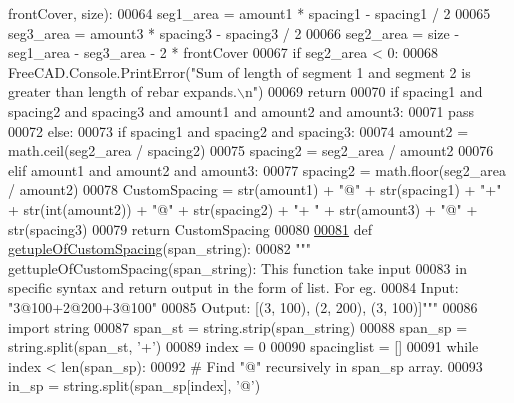 \begin{DoxyCode}
      frontCover, size):
00064     seg1\_area = amount1 * spacing1 - spacing1 / 2
00065     seg3\_area = amount3 * spacing3 - spacing3 / 2
00066     seg2\_area = size - seg1\_area - seg3\_area - 2 * frontCover
00067     \textcolor{keywordflow}{if} seg2\_area < 0:
00068         FreeCAD.Console.PrintError(\textcolor{stringliteral}{"Sum of length of segment 1 and segment 2 is greater than length of
       rebar expands.\(\backslash\)n"})
00069         \textcolor{keywordflow}{return}
00070     \textcolor{keywordflow}{if} spacing1 \textcolor{keywordflow}{and} spacing2 \textcolor{keywordflow}{and} spacing3 \textcolor{keywordflow}{and} amount1 \textcolor{keywordflow}{and} amount2 \textcolor{keywordflow}{and} amount3:
00071         \textcolor{keywordflow}{pass}
00072     \textcolor{keywordflow}{else}:
00073         \textcolor{keywordflow}{if} spacing1 \textcolor{keywordflow}{and} spacing2 \textcolor{keywordflow}{and} spacing3:
00074             amount2 = math.ceil(seg2\_area / spacing2)
00075             spacing2 = seg2\_area / amount2
00076         \textcolor{keywordflow}{elif} amount1 \textcolor{keywordflow}{and} amount2 \textcolor{keywordflow}{and} amount3:
00077             spacing2 = math.floor(seg2\_area / amount2)
00078     CustomSpacing = str(amount1) + \textcolor{stringliteral}{"@"} + str(spacing1) + \textcolor{stringliteral}{"+"} + str(int(amount2)) + \textcolor{stringliteral}{"@"} + str(spacing2) + \textcolor{stringliteral}{"+
      "} + str(amount3) + \textcolor{stringliteral}{"@"} + str(spacing3)
00079     \textcolor{keywordflow}{return} CustomSpacing
00080 
\hypertarget{RebarDistribution_8py_source.tex_l00081}{}\hyperlink{namespaceRebarDistribution_a59ac567a8536ea3b5e7a9900a898e0c0}{00081} \textcolor{keyword}{def }\hyperlink{namespaceRebarDistribution_a59ac567a8536ea3b5e7a9900a898e0c0}{getupleOfCustomSpacing}(span\_string):
00082     \textcolor{stringliteral}{""" gettupleOfCustomSpacing(span\_string): This function take input}
00083 \textcolor{stringliteral}{    in specific syntax and return output in the form of list. For eg.}
00084 \textcolor{stringliteral}{    Input: "3@100+2@200+3@100"}
00085 \textcolor{stringliteral}{    Output: [(3, 100), (2, 200), (3, 100)]"""}
00086     \textcolor{keyword}{import} string
00087     span\_st = string.strip(span\_string)
00088     span\_sp = string.split(span\_st, \textcolor{stringliteral}{'+'})
00089     index = 0
00090     spacinglist = []
00091     \textcolor{keywordflow}{while} index < len(span\_sp):
00092         \textcolor{comment}{# Find "@" recursively in span\_sp array.}
00093         in\_sp = string.split(span\_sp[index], \textcolor{stringliteral}{'@'})

\end{DoxyCode}
